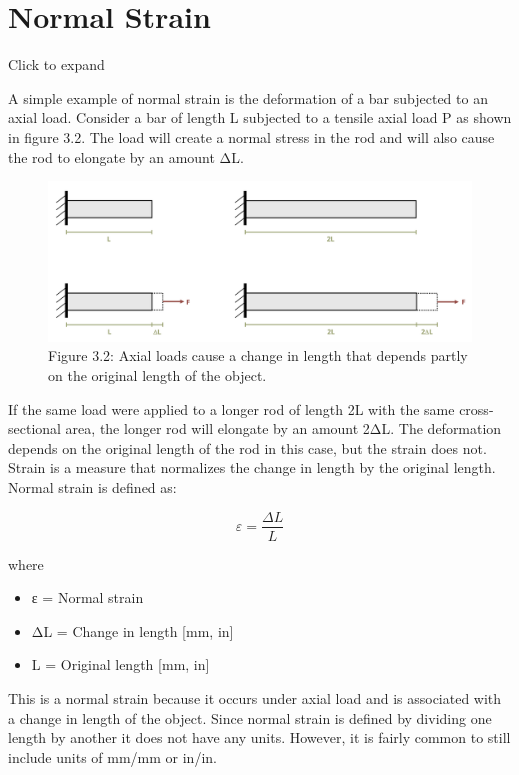 \documentclass[
  letterpaper,
  DIV=11,
  numbers=noendperiod]{scrreprt}
\begin{document}
\section{Normal Strain}\label{sec-3.1}

Click to expand

A simple example of normal strain is the deformation of a bar subjected
to an axial load. Consider a bar of length L subjected to a tensile
axial load P as shown in figure 3.2. The load will create a normal
stress in the rod and will also cause the rod to elongate by an amount
ΔL.

\begin{figure}[H]

{\centering \includegraphics{images/CH3 PNGs/figure 3.2.png}

}

\caption{Figure 3.2: Axial loads cause a change in length that depends
partly on the original length of the object.}

\end{figure}%

If the same load were applied to a longer rod of length 2L with the same
cross-sectional area, the longer rod will elongate by an amount 2ΔL. The
deformation depends on the original length of the rod in this case, but
the strain does not. Strain is a measure that normalizes the change in
length by the original length. Normal strain is defined as:

\[
\varepsilon=\frac{\Delta L}{L}
\]

where

\begin{itemize}
\item
  ε = Normal strain
\item
  ΔL = Change in length {[}mm, in{]}
\item
  L = Original length {[}mm, in{]}
\end{itemize}

This is a normal strain because it occurs under axial load and is
associated with a change in length of the object. Since normal strain is
defined by dividing one length by another it does not have any units.
However, it is fairly common to still include units of mm/mm or in/in.
\end{document}
